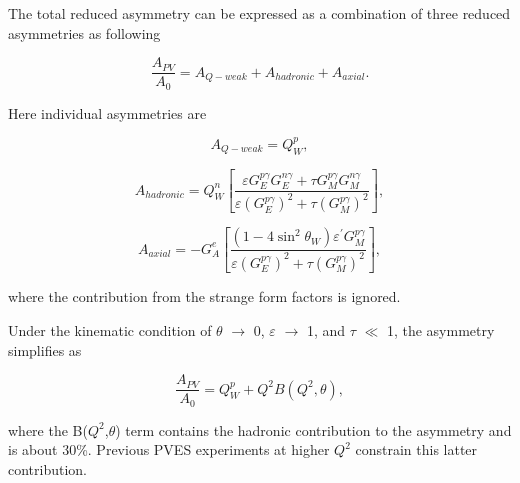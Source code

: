 The total reduced asymmetry can be expressed as a combination of three reduced asymmetries as following

\begin{equation} \label{equ:qweak11}
\frac{A_{PV}}{A_{0}} = A_{Q-weak}  + A_{hadronic}  + A_{axial}.
\end{equation}


Here individual asymmetries are

\begin{equation} \label{equ:qweak12}
A_{Q-weak} = Q_{W}^{p},
\end{equation}

\begin{equation} \label{equ:qweak13}
A_{hadronic} = Q_{W}^{n}\left[\frac{{\varepsilon}{G_{E}^{p\gamma}}{G_{E}^{n\gamma}} + {\tau}{G_{M}^{p\gamma}}{G_{M}^{n\gamma}} }{ {\varepsilon}({G_{E}^{p\gamma}})^{2} + {\tau}({G_{M}^{p\gamma}})^{2} } \right],
\end{equation}

\begin{equation} \label{equ:qweak14}
A_{axial} = - G_{A}^{e}\left[\frac{(1-4\sin^{2}\theta_{W}){\varepsilon^{\prime}}G_{M}^{p\gamma} }{ {\varepsilon}({G_{E}^{p\gamma}})^{2} + {\tau}({G_{M}^{p\gamma}})^{2} } \right],
\end{equation}

\noindent
where the contribution from the strange form factors is ignored.

Under the kinematic condition of $\theta$ $\rightarrow$ 0, $\varepsilon$ $\rightarrow$ 1, and $\tau$ $\ll$ 1, the asymmetry simplifies as 

\begin{equation} \label{equ:qweak15}
\frac{A_{PV}}{A_{0}} = Q_{W}^{p} + Q^{2}B(Q^{2}, \theta),
\end{equation}

\noindent
where the B($Q^{2}$,$\theta$) term contains the hadronic contribution to the asymmetry and is about 30\%. Previous PVES experiments at higher $Q^{2}$ constrain this latter contribution.



